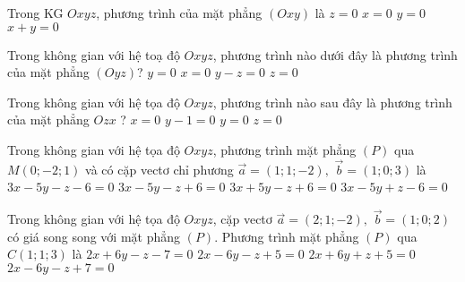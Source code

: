 \begin{ex}%
	Trong KG $Oxyz$, phương trình của mặt phẳng $(Oxy)$ là
	\choice
	{\True $z=0$}
	{$x=0$}
	{$y=0$}
	{$x+y=0$}
\end{ex}

\begin{ex}%
	Trong không gian với hệ toạ độ $Oxyz$, phương trình nào dưới đây là phương trình của mặt phẳng $(Oyz)$?
	\choice
	{$y=0$}
	{\True $x=0$}
	{$y-z=0$}
	{$z=0$}
\end{ex}
\begin{ex}%
	Trong không gian với hệ tọa độ $O x y z$, phương trình nào sau đây là phương trình của mặt phẳng $O z x$ ?
	\choice
	{$x=0$}
	{$y-1=0$}
	{\True $y=0$}
	{$z=0$}
\end{ex}

\begin{ex}%
	Trong không gian với hệ tọa độ $O x y z$, phương trình mặt phẳng $(P)$ qua $M(0 ;-2 ; 1)$ và có cặp vectơ  chỉ phương $\vec{a}=(1 ; 1 ;-2),$ $ \vec{b}=(1 ; 0 ; 3)$ là
	\choice
	{\True $3 x-5 y-z-6=0$}
	{$3 x-5 y-z+6=0$}
	{$3 x+5 y-z+6=0$}
	{$3 x-5 y+z-6=0$}
\end{ex}
\begin{ex}%
	Trong không gian với hệ tọa độ $O x y z$, cặp vectơ  $\vec{a}=(2 ; 1 ;-2), $ $\vec{b}=(1 ; 0 ; 2)$ có giá song song với mặt phẳng $(P)$. Phương trình mặt phẳng $(P)$ qua $C(1 ; 1 ; 3)$ là
	\choice
	{$2 x+6 y-z-7=0$}
	{$2 x-6 y-z+5=0$}
	{$2 x+6 y+z+5=0$}
	{\True $2 x-6 y-z+7=0$}
\end{ex}

